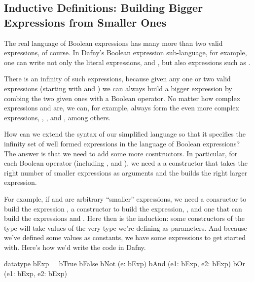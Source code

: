 \documentclass[letterpaper,10pt,english]{sphinxmanual}
\begin{document}
\subsection{Inductive Definitions: Building Bigger Expressions from Smaller Ones}
\label{\detokenize{10-formal-languages:inductive-definitions-building-bigger-expressions-from-smaller-ones}}
The real language of Boolean expressions has many more than two valid
expressions, of course. In Dafny’s Boolean expression sub-language,
for example, one can write not only the literal expressions, 
and , but also expressions such as .

There is an infinity of such expressions, because given any one or two
valid expressions (starting with  and ) we can always
build a bigger expression by combing the two given ones with a Boolean
operator. No matter how complex expressions  and  are, we can,
for example, always form the even more complex expressions, , , and , among others.

How can we extend the syntax of our simplified language so that it
specifies the infinity set of well formed expressions in the language
of Boolean expressions? The answer is that we need to add some more
cosntructors. In particular, for each Boolean operator (including
, and ), we need a a constructor that takes the right
number of smaller expressions as arguments and the builds the right
larger expression.

For example, if  and  are arbitrary “smaller” expressions, we
need a consructor to build the expression , a constructor to
build the expression, , and one that can build the expressions
 and . Here then is the induction: some constructors of
the  type will take values of the very type we’re defining as
parameters. And because we’ve defined some values as constants, we
have some expressions to get started with. Here’s how we’d write the
code in Dafny.

\begin{sphinxVerbatim}[commandchars=\\\{\}]
datatype bExp =
     bTrue \textbar{}
     bFalse \textbar{}
     bNot (e: bExp) \textbar{}
     bAnd (e1: bExp, e2: bExp) \textbar{}
     bOr (e1: bExp, e2: bExp)
\end{sphinxVerbatim}
\end{document}
